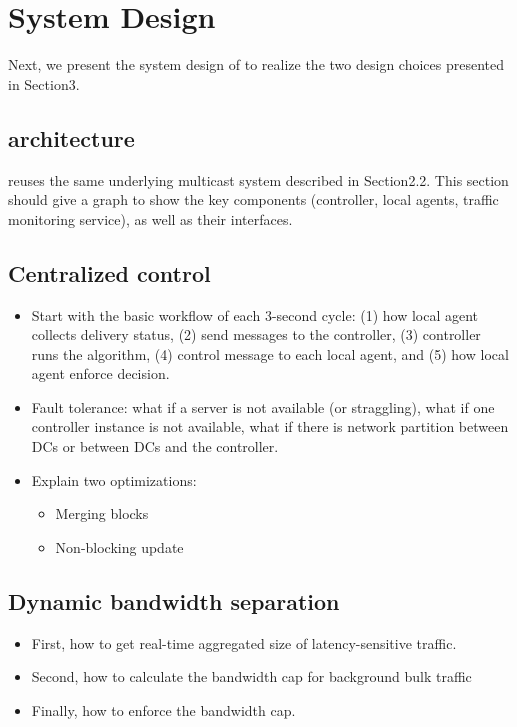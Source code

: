 \section{System Design}

Next, we present the system design of \name to realize the two design choices presented in Section3.

\subsection{\name architecture}

\name reuses the same underlying multicast system described in Section2.2. This section should give a graph to show the key components (controller, local agents, traffic monitoring service), as well as their interfaces.

\subsection{Centralized control}
\begin{itemize}

\item Start with the basic workflow of each 3-second cycle: (1) how local agent collects delivery status, (2) send messages to the controller, (3) controller runs the algorithm, (4) control message to each local agent, and (5) how local agent enforce decision.

\item Fault tolerance: what if a server is not available (or straggling), what if one controller instance is not available, what if there is network partition between DCs or between DCs and the controller.

\item Explain two optimizations:
\begin{itemize}
\item Merging blocks
\item Non-blocking update
\end{itemize}

\end{itemize}

\subsection{Dynamic bandwidth separation}

\begin{itemize}

\item First, how to get real-time aggregated size of latency-sensitive traffic.

\item Second, how to calculate the bandwidth cap for background bulk traffic

\item Finally, how to enforce the bandwidth cap.

\end{itemize}



